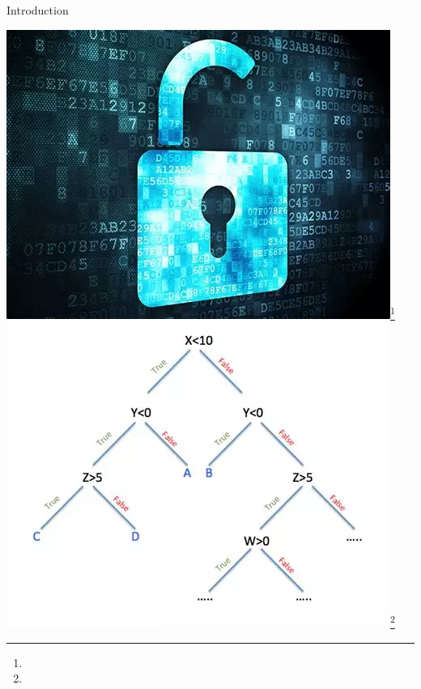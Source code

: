 \documentclass[]{sdqbeamer}
\begin{document}
\begin{frame}{Introduction}
\begin{minipage}{.45\textwidth}
        \includegraphics[scale=.35]{images/Cryptography.png}\footnote{\cryptourl}
        \includegraphics[scale=.35]{images/decition_tree.png}\footnote{\aiurl}
    \end{minipage}
\end{frame}

\end{document}
